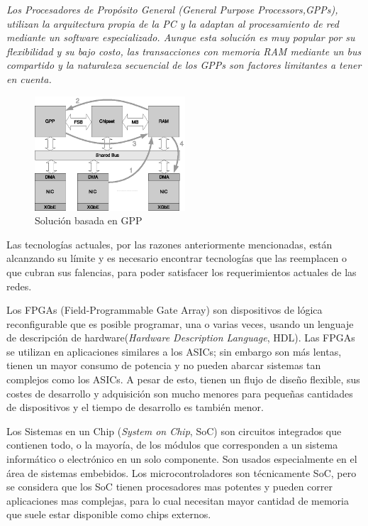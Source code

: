 \emph{Los Procesadores de Propósito General (General Purpose Processors,GPPs), utilizan la arquitectura propia de la PC y la adaptan al procesamiento de red mediante un software especializado. Aunque esta solución es muy popular por su flexibilidad y su bajo costo, las transacciones con memoria RAM mediante un bus compartido y la naturaleza secuencial de los GPPs son factores limitantes a tener en cuenta. }
 \begin{figure}[h]
  \centering
      \includegraphics[width=0.5\textwidth]{1-introduccion/graf/GPP_based.eps}
  \caption{Solución basada en GPP}
  \label{fig:diseno}
\end{figure}

Las tecnologías actuales, por las razones anteriormente mencionadas, están alcanzando su límite y es necesario encontrar tecnologías que las reemplacen o que cubran sus falencias, para poder satisfacer los requerimientos actuales de las redes. 

Los FPGAs (Field-Programmable Gate Array) son dispositivos de lógica reconfigurable que es posible programar, una o varias veces, usando un lenguaje de descripción de hardware(\textit{Hardware Description Language}, HDL). Las FPGAs se utilizan en aplicaciones similares a los ASICs; sin embargo son más lentas, tienen un mayor consumo de potencia y no pueden abarcar sistemas tan complejos como los ASICs. A pesar de esto, tienen un flujo de diseño flexible, sus costes de desarrollo y adquisición son mucho menores para pequeñas cantidades de dispositivos y el tiempo de desarrollo es también menor.



Los Sistemas en un Chip (\textit{System on Chip}, SoC) son circuitos integrados que contienen todo, o la mayoría, de los módulos que corresponden a un sistema informático o electrónico en un solo componente. Son usados especialmente en el área de sistemas embebidos. Los microcontroladores son técnicamente SoC, pero se considera que los SoC tienen procesadores mas potentes y pueden correr aplicaciones mas complejas, para lo cual necesitan mayor cantidad de memoria que suele estar disponible como chips externos. 

